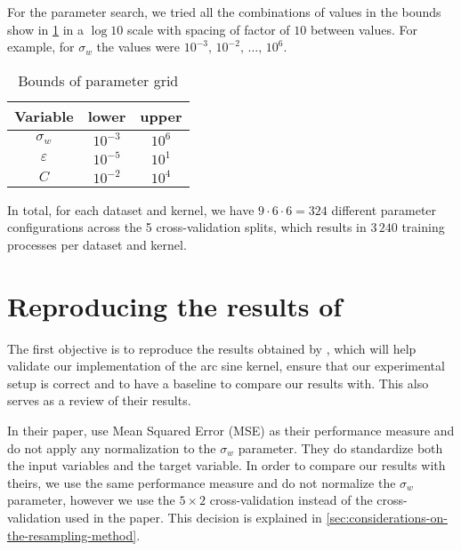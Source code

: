 For the parameter search, we tried all the combinations of values in the bounds
show in \cref{tab:paramgrid} in a $\log 10$ scale with spacing of factor of $10$
between values. For example, for $\sigma_w$ the values were
$10^{-3},\,10^{-2},\,\dots,\,10^{6}$.

\begin{table}[H]
    \caption{Bounds of parameter grid}%
    \label{tab:paramgrid}
    \begin{tabular}{ccc}
        \toprule
        Variable      & lower     & upper  \\
        \midrule
        $\sigma_w$    & $10^{-3}$ & $10^6$ \\
        $\varepsilon$ & $10^{-5}$ & $10^1$ \\
        $C$           & $10^{-2}$ & $10^4$ \\
        \bottomrule
    \end{tabular}
\end{table}

In total, for each dataset and kernel, we have $9 \cdot 6 \cdot 6 = 324$ different
parameter configurations across the 5 cross-validation splits, which
results in $3\,240$ training processes per dataset and kernel.

\section{Reproducing the results of \texorpdfstring{\citeauthor{frenayParameterinsensitiveKernelExtreme2011}}{Frénay and Verleysen}}
\label{sec:reproducing-frenay}

The first objective is to reproduce the results obtained by
\textcite{frenayParameterinsensitiveKernelExtreme2011}, which will help validate
our implementation of the arc sine kernel, ensure that our experimental setup is
correct and to have a baseline to compare our results with. This also serves as
a review of their results.

In their paper, \citeauthor{frenayParameterinsensitiveKernelExtreme2011} use
Mean Squared Error (MSE) as their performance measure and do not apply any
normalization to the $\sigma_w$ parameter. They do standardize both the input
variables and the target variable. In order to compare our results with theirs,
we use the same performance measure and do not normalize the $\sigma_w$ parameter,
however we use the $5\times2$ cross-validation instead of the cross-validation used
in the paper. This decision is explained in \cref{sec:considerations-on-the-resampling-method}.

